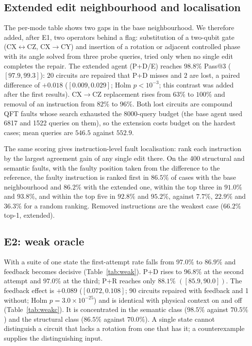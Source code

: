 \documentclass[journal]{IEEEtran}
\begin{document}
\subsection{Extended edit neighbourhood and localisation}

The per-mode table shows two gaps in the base neighbourhood. We therefore added,
after E1, two operators behind a flag: substitution of a two-qubit gate (CX$\leftrightarrow$CZ,
CX$\to$CY) and insertion of a rotation or adjacent controlled phase with its angle
solved from three probe queries, tried only when no single edit completes the
repair. The extended agent (P+D/E) reaches $98.8\%$ Pass@3 ($[97.9,99.3]$): $20$
circuits are repaired that P+D misses and $2$ are lost, a paired difference of
$+0.018$ ($[0.009,0.029]$; Holm $p<10^{-3}$; this contrast was added after the
first results). CX$\to$CZ replacement rises from $63\%$ to $100\%$ and removal of
an instruction from $82\%$ to $96\%$. Both lost circuits are compound QFT faults
whose search exhausted the 8000-query budget (the base agent used 6817 and 1522
queries on them), so the extension costs budget on the hardest cases; mean
queries are $546.5$ against $552.9$.

The same scoring gives instruction-level fault localisation: rank each instruction
by the largest agreement gain of any single edit there. On the 400 structural
and semantic faults, with the faulty position taken from the difference to the
reference, the faulty instruction is ranked first in $86.5\%$ of cases with the
base neighbourhood and $86.2\%$ with the extended one, within the top three in
$91.0\%$ and $93.8\%$, and within the top five in $92.8\%$ and $95.2\%$, against
$7.7\%$, $22.9\%$ and $36.3\%$ for a random ranking. Removed instructions are the
weakest case ($66.2\%$ top-1, extended).

\subsection{E2: weak oracle}

With a suite of one state the first-attempt rate falls from $97.0\%$ to $86.9\%$
and feedback becomes decisive (Table~\ref{tab:weak}). P+D rises to $96.8\%$ at the
second attempt and $97.0\%$ at the third; P+R reaches only $88.1\%$
$([85.9,90.0])$. The feedback effect is $+0.089$ ($[0.072,0.108]$; 90 circuits
repaired with feedback and 1 without; Holm $p=3.0\times10^{-25}$) and is
identical with physical context on and off (Table~\ref{tab:weakc}). It is
concentrated in the semantic class ($98.5\%$ against $70.5\%$) and the structural
class ($86.5\%$ against $70.0\%$). A single state cannot distinguish a circuit
that lacks a rotation from one that has it; a counterexample supplies the
distinguishing input.
\end{document}
